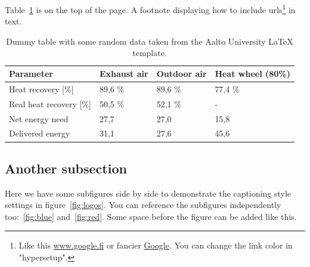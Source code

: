 \documentclass[12pt, a4paper, oneside]{article}
\begin{document}
\blindtext[2]

Table~\ref{tab:example} is on the top of the page.
A footnote displaying how to include urls\footnote{Like this \url{www.google.fi} or fancier \href{www.google.fi}{Google}.
    You can change the link color in "hypersetup".} in text.

\begin{table}[t]
    \centering
    \caption[Dummy table]{Dummy table with some random data taken from the Aalto University LaTeX template.}
    \begin{tabularx}{\textwidth}{Xlll}
        \toprule
        \textbf{Parameter}      & \textbf{Exhaust air} & \textbf{Outdoor air} & \textbf{Heat wheel (80\%)} \\
        \midrule
        Heat recovery [\%]      & 89,6 \%              & 89,6 \%              & 77,4 \%                    \\
        Real heat recovery [\%] & 50,5 \%              & 52,1 \%              & -                          \\
        Net energy need         & 27,7                 & 27,0                 & 15,8                       \\
        Delivered energy        & 31,1                 & 27,6                 & 45,6                       \\
        \bottomrule
    \end{tabularx}
    \label{tab:example}
\end{table}

\subsection{Another subsection} \label{subsec:another-subsection}

Here we have some subfigures side by side to demonstrate the captioning style settings in figure~\ref{fig:logos}.
You can reference the subfigures independently too:~\ref{fig:blue} and~\ref{fig:red}.
Some space before the figure can be added like this. \medskip
\end{document}
